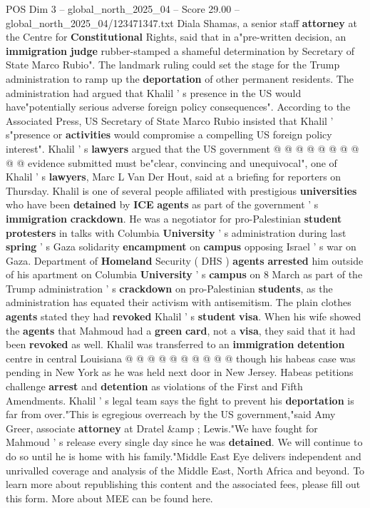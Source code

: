 \begin{textsample}{POS Dim 3 – global\_north\_2025\_04 – Score 29.00 – global\_north\_2025\_04/123471347.txt}
Diala Shamas, a senior staff \textbf{attorney} at the Centre for \textbf{Constitutional} Rights, said that in a"pre-written decision, an \textbf{immigration} \textbf{judge} rubber-stamped a shameful determination by Secretary of State Marco Rubio".
The landmark ruling could set the stage for the Trump administration to ramp up the \textbf{deportation} of other permanent residents.
The administration had argued that Khalil ' s presence in the US would have"potentially serious adverse foreign policy consequences".
According to the Associated Press, US Secretary of State Marco Rubio insisted that Khalil ' s"presence or \textbf{activities} would compromise a compelling US foreign policy interest".
Khalil ' s \textbf{lawyers} argued that the US government @ @ @ @ @ @ @ @ @ @ evidence submitted must be"clear, convincing and unequivocal", one of Khalil ' s \textbf{lawyers}, Marc L Van Der Hout, said at a briefing for reporters on Thursday.
Khalil is one of several people affiliated with prestigious \textbf{universities} who have been \textbf{detained} by \textbf{ICE} \textbf{agents} as part of the government ' s \textbf{immigration} \textbf{crackdown}.
He was a negotiator for pro-Palestinian \textbf{student} \textbf{protesters} in talks with Columbia \textbf{University} ' s administration during last \textbf{spring} ' s Gaza solidarity \textbf{encampment} on \textbf{campus} opposing Israel ' s war on Gaza.
Department of \textbf{Homeland} Security ( DHS ) \textbf{agents} \textbf{arrested} him outside of his apartment on Columbia \textbf{University} ' s \textbf{campus} on 8 March as part of the Trump administration ' s \textbf{crackdown} on pro-Palestinian \textbf{students}, as the administration has equated their activism with antisemitism.
The plain clothes \textbf{agents} stated they had \textbf{revoked} Khalil ' s \textbf{student} \textbf{visa}.
When his wife showed the \textbf{agents} that Mahmoud had a \textbf{green} \textbf{card}, not a \textbf{visa}, they said that it had been \textbf{revoked} as well.
Khalil was transferred to an \textbf{immigration} \textbf{detention} centre in central Louisiana @ @ @ @ @ @ @ @ @ @ though his habeas case was pending in New York as he was held next door in New Jersey.
Habeas petitions challenge \textbf{arrest} and \textbf{detention} as violations of the First and Fifth Amendments.
Khalil ' s legal team says the fight to prevent his \textbf{deportation} is far from over."This is egregious overreach by the US government,"said Amy Greer, associate \textbf{attorney} at Dratel \&amp ; Lewis."We have fought for Mahmoud ' s release every single day since he was \textbf{detained}.
We will continue to do so until he is home with his family."Middle East Eye delivers independent and unrivalled coverage and analysis of the Middle East, North Africa and beyond.
To learn more about republishing this content and the associated fees, please fill out this form.
More about MEE can be found here.


\end{textsample}
